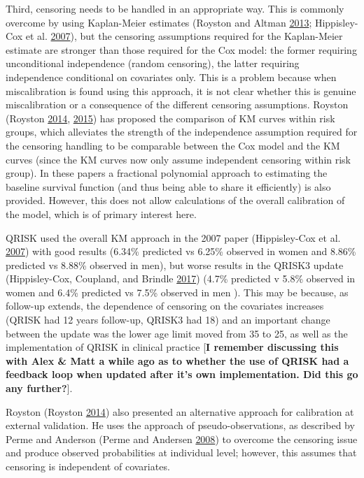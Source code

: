 \documentclass[
]{article}
\begin{document}
Third, censoring needs to be handled in an appropriate way. This is commonly overcome by using Kaplan-Meier estimates (Royston and Altman \protect\hyperlink{ref-royston_external_2013}{2013}; Hippisley-Cox et al. \protect\hyperlink{ref-hippisley-cox_derivation_2007}{2007}), but the censoring assumptions required for the Kaplan-Meier estimate are stronger than those required for the Cox model: the former requiring unconditional independence (random censoring), the latter requiring independence conditional on covariates only. This is a problem because when miscalibration is found using this approach, it is not clear whether this is genuine miscalibration or a consequence of the different censoring assumptions. Royston (Royston \protect\hyperlink{ref-royston_tools_2014}{2014}, \protect\hyperlink{ref-royston_tools_2015}{2015}) has proposed the comparison of KM curves within risk groups, which alleviates the strength of the independence assumption required for the censoring handling to be comparable between the Cox model and the KM curves (since the KM curves now only assume independent censoring within risk group). In these papers a fractional polynomial approach to estimating the baseline survival function (and thus being able to share it efficiently) is also provided. However, this does not allow calculations of the overall calibration of the model, which is of primary interest here.

QRISK used the overall KM approach in the 2007 paper (Hippisley-Cox et al. \protect\hyperlink{ref-hippisley-cox_derivation_2007}{2007}) with good results (6.34\% predicted vs 6.25\% observed in women and 8.86\% predicted vs 8.88\% observed in men), but worse results in the QRISK3 update (Hippisley-Cox, Coupland, and Brindle \protect\hyperlink{ref-hippisley-cox_development_2017}{2017}) (4.7\% predicted v 5.8\% observed in women and 6.4\% predicted vs 7.5\% observed in men ). This may be because, as follow-up extends, the dependence of censoring on the covariates increases (QRISK had 12 years follow-up, QRISK3 had 18) and an important change between the update was the lower age limit moved from 35 to 25, as well as the implementation of QRISK in clinical practice {[}\textbf{I remember discussing this with Alex \& Matt a while ago as to whether the use of QRISK had a feedback loop when updated after it's own implementation. Did this go any further?}{]}.

Royston (Royston \protect\hyperlink{ref-royston_tools_2014}{2014}) also presented an alternative approach for calibration at external validation. He uses the approach of pseudo-observations, as described by Perme and Anderson (Perme and Andersen \protect\hyperlink{ref-perme_checking_2008}{2008}) to overcome the censoring issue and produce observed probabilities at individual level; however, this assumes that censoring is independent of covariates.
\end{document}
